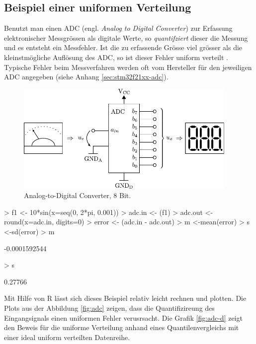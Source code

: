 \clearpage
\subsection{Beispiel einer uniformen Verteilung}
Benutzt man einen ADC (engl. \emph{Analog to Digital Converter}) zur 
Erfassung elektronischer Messgrössen als digitale Werte, so 
\emph{quantifziert} dieser die Messung und es entsteht ein Messfehler. 
Ist die zu erfassende Grösse viel grösser als die kleinstmögliche 
Auflösung des ADC, so ist dieser Fehler uniform verteilt 
\parencite[615]{taoe}. Typische Fehler beim Messverfahren werden oft
vom Hersteller für den jeweiligen ADC angegeben 
(siehe Anhang \ref{sec:stm32f21xx-adc}).

\begin{figure}[h!]
	\centering
	\includegraphics[width=0.95\textwidth]{adc-system.pdf}
	\caption{Analog-to-Digital Converter, 8 Bit.}
\end{figure}

\begin{Schunk}
\begin{Sinput}
> f1 <- 10*sin(x=seq(0, 2*pi, 0.001))
> adc.in  <- (f1)
> adc.out <- round(x=adc.in, digits=0)
> error   <- (adc.in - adc.out)
> m <-mean(error)
> s <-sd(error)
> m
\end{Sinput}
\begin{Soutput}
[1] -0.0001592544
\end{Soutput}
\begin{Sinput}
> s
\end{Sinput}
\begin{Soutput}
[1] 0.27766
\end{Soutput}
\end{Schunk}

\noindent
Mit Hilfe von R lässt sich dieses Beispiel relativ leicht rechnen und
plotten. Die Plots aus der Abbildung \ref{fig:adc} zeigen, dass die 
Quantifizireung des Eingangsignals einen uniformen Fehler verusrsacht.
Die Grafik \ref{fig:adc-d} zeigt den Beweis für die uniforme Verteilung
anhand eines Quantilenvergleichs mit einer ideal uniform verteilten
Datenreihe.





